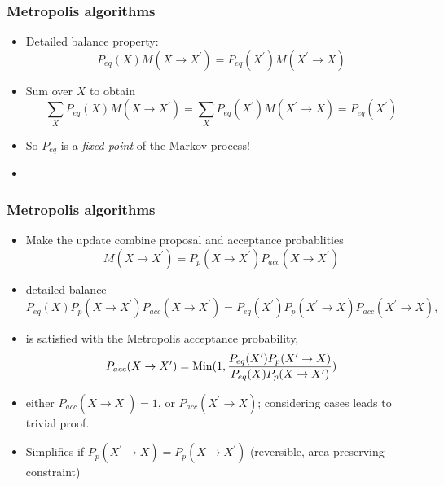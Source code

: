 \documentclass[pdf,ps,8pt]{beamer}
\begin{document}
\begin{frame}[fragile]\small\frametitle{Metropolis algorithms}
  \begin{itemize}
  \item Detailed balance property:
$$
P_{eq}(X) M(X\to X^\prime) = P_{eq}(X^\prime) M(X^\prime\to X)
$$
\item Sum over $X$ to obtain
$$
\sum\limits_X P_{eq}(X) M(X\to X^\prime) = \sum\limits_X P_{eq}(X^\prime) M(X^\prime\to X)= P_{eq}(X^\prime) 
$$
\item So $P_{eq}$ is a \emph{fixed point} of the Markov process!
\item {}
\end{itemize}
\end{frame}

\begin{frame}[fragile]\small\frametitle{Metropolis algorithms}
\begin{itemize}
\item Make the update combine proposal and acceptance probablities
$$
M(X\to X^\prime) = P_p(X\to X^\prime) P_{acc}(X\to X^\prime)
$$
\item detailed balance
$$
P_{eq}(X) P_p(X\to X^\prime) P_{acc}(X\to X^\prime) = P_{eq}(X^\prime)  P_p(X^\prime\to X) P_{acc}(X^\prime\to X ),
$$
\item is satisfied with the Metropolis acceptance probability, 
$$
P_{acc}(X\to X^\prime) = {\rm Min} ( 1, \frac{P_{eq}(X^\prime)  P_p(X^\prime\to X)}{P_{eq}(X) P_p(X\to X^\prime) } )
$$
\item either $P_{acc}(X\to X^\prime) = 1$, or $P_{acc}(X^\prime\to X)$; considering cases leads to trivial proof.
\item Simplifies if $P_p(X^\prime\to X) = P_p(X\to X^\prime)$ (reversible, area preserving constraint)
\end{itemize}
\begin{center}
\end{center}
\end{frame}
\end{document}
